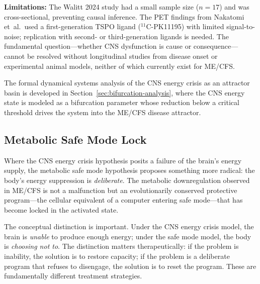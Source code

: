 \begin{hypothesis}
\textbf{Limitations:} The Walitt 2024 study had a small sample size ($n=17$) and was cross-sectional, preventing causal inference. The PET findings from Nakatomi et~al.\ used a first-generation TSPO ligand ($^{11}$C-PK11195) with limited signal-to-noise; replication with second- or third-generation ligands is needed. The fundamental question---whether CNS dysfunction is cause or consequence---cannot be resolved without longitudinal studies from disease onset or experimental animal models, neither of which currently exist for ME/CFS.
\end{hypothesis}

The formal dynamical systems analysis of the CNS energy crisis as an attractor basin is developed in Section~\ref{sec:bifurcation-analysis}, where the CNS energy state is modeled as a bifurcation parameter whose reduction below a critical threshold drives the system into the ME/CFS disease attractor.


\subsection{Metabolic Safe Mode Lock}
\label{sec:root-safe-mode}

Where the CNS energy crisis hypothesis posits a failure of the brain's energy supply, the metabolic safe mode hypothesis proposes something more radical: the body's energy suppression is \emph{deliberate}. The metabolic downregulation observed in ME/CFS is not a malfunction but an evolutionarily conserved protective program---the cellular equivalent of a computer entering safe mode---that has become locked in the activated state.

The conceptual distinction is important. Under the CNS energy crisis model, the brain is \emph{unable} to produce enough energy; under the safe mode model, the body is \emph{choosing not to}. The distinction matters therapeutically: if the problem is inability, the solution is to restore capacity; if the problem is a deliberate program that refuses to disengage, the solution is to reset the program. These are fundamentally different treatment strategies.


